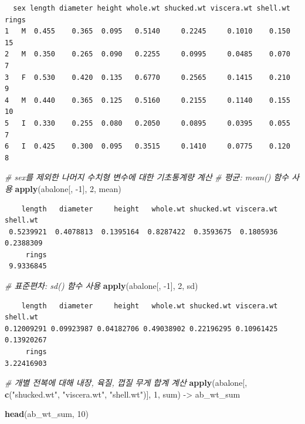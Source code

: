 \documentclass[
  11pt,
]{krantz}
\newenvironment{Shaded}{\begin{snugshade}}{\end{snugshade}}
\newcommand{\CommentTok}[1]{\textcolor[rgb]{0.37,0.37,0.37}{\textit{#1}}}
\newcommand{\DecValTok}[1]{\textcolor[rgb]{0.06,0.06,0.06}{#1}}
\newcommand{\KeywordTok}[1]{\textcolor[rgb]{0.27,0.27,0.27}{\textbf{#1}}}
\newcommand{\NormalTok}[1]{#1}
\newcommand{\StringTok}[1]{\textcolor[rgb]{0.5,0.5,0.5}{#1}}
\begin{document}
\begin{verbatim}
  sex length diameter height whole.wt shucked.wt viscera.wt shell.wt rings
1   M  0.455    0.365  0.095   0.5140     0.2245     0.1010    0.150    15
2   M  0.350    0.265  0.090   0.2255     0.0995     0.0485    0.070     7
3   F  0.530    0.420  0.135   0.6770     0.2565     0.1415    0.210     9
4   M  0.440    0.365  0.125   0.5160     0.2155     0.1140    0.155    10
5   I  0.330    0.255  0.080   0.2050     0.0895     0.0395    0.055     7
6   I  0.425    0.300  0.095   0.3515     0.1410     0.0775    0.120     8
\end{verbatim}

\begin{Shaded}
\begin{Highlighting}[]
\CommentTok{# sex를 제외한 나머지 수치형 변수에 대한 기초통계량  계산}
\CommentTok{# 평균: mean() 함수 사용}
\KeywordTok{apply}\NormalTok{(abalone[, }\DecValTok{-1}\NormalTok{], }\DecValTok{2}\NormalTok{, mean)}
\end{Highlighting}
\end{Shaded}

\begin{verbatim}
    length   diameter     height   whole.wt shucked.wt viscera.wt   shell.wt 
 0.5239921  0.4078813  0.1395164  0.8287422  0.3593675  0.1805936  0.2388309 
     rings 
 9.9336845 
\end{verbatim}

\begin{Shaded}
\begin{Highlighting}[]
\CommentTok{# 표준편차: sd() 함수 사용}
\KeywordTok{apply}\NormalTok{(abalone[, }\DecValTok{-1}\NormalTok{], }\DecValTok{2}\NormalTok{, sd)}
\end{Highlighting}
\end{Shaded}

\begin{verbatim}
    length   diameter     height   whole.wt shucked.wt viscera.wt   shell.wt 
0.12009291 0.09923987 0.04182706 0.49038902 0.22196295 0.10961425 0.13920267 
     rings 
3.22416903 
\end{verbatim}

\begin{Shaded}
\begin{Highlighting}[]
\CommentTok{# 개별 전복에 대해 내장, 육질, 껍질 무게 합계 계산}
\KeywordTok{apply}\NormalTok{(abalone[, }\KeywordTok{c}\NormalTok{(}\StringTok{"shucked.wt"}\NormalTok{, }
                  \StringTok{"viscera.wt"}\NormalTok{, }
                  \StringTok{"shell.wt"}\NormalTok{)], }\DecValTok{1}\NormalTok{, }
\NormalTok{      sum) ->}\StringTok{ }\NormalTok{ab_wt_sum}

\KeywordTok{head}\NormalTok{(ab_wt_sum, }\DecValTok{10}\NormalTok{)}
\end{Highlighting}
\end{Shaded}
\end{document}
